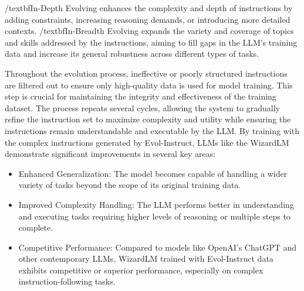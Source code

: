 \begin{itemize}
{	      /textbf{In-Depth Evolving} enhances the complexity and depth of instructions by adding constraints, increasing reasoning demands, or introducing more detailed contexts.
	      /textbf{In-Breadth Evolving} expands the variety and coverage of topics and skills addressed by the instructions, aiming to fill gaps in the LLM’s training data and increase its general robustness across different types of tasks.

	      Throughout the evolution process, ineffective or poorly structured instructions are filtered out to ensure only high-quality data is used for model training. This step is crucial for maintaining the integrity and effectiveness of the training dataset.
	      The process repeats several cycles, allowing the system to gradually refine the instruction set to maximize complexity and utility while ensuring the instructions remain understandable and executable by the LLM.
	      By training with the complex instructions generated by Evol-Instruct, LLMs like the WizardLM demonstrate significant improvements in several key areas:
	      \begin{itemize}
		      \item Enhanced Generalization: The model becomes capable of handling a wider variety of tasks beyond the scope of its original training data.
		      \item Improved Complexity Handling: The LLM performs better in understanding and executing tasks requiring higher levels of reasoning or multiple steps to complete.
		      \item Competitive Performance: Compared to models like OpenAI's ChatGPT and other contemporary LLMs, WizardLM trained with Evol-Instruct data exhibits competitive or superior performance, especially on complex instruction-following tasks.
	      \end{itemize}
	      }
\end{itemize}


